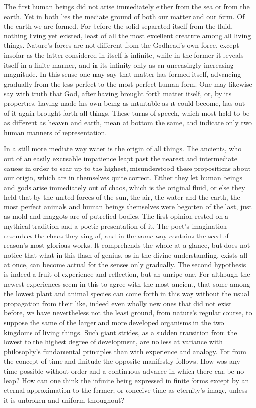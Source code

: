 \documentclass[12pt,a4paper,openany]{book}
\newcommand{\opage}[1]{\marginnote{\footnotesize\textit{[#1]}}}
\begin{document}
The first human beings did not arise immediately either from the sea or from the
earth. Yet in both lies the mediate ground of both our matter and our form. Of the
earth we are formed. For before the solid separated itself from the fluid, nothing
living yet existed, least of all the most excellent creature among all living things.
Nature's forces are not different from the Godhead's own force, except insofar as
the latter considered in itself is infinite, while in the former it reveals itself in
a finite manner, and in its infinity only as an unceasingly increasing magnitude. In
this sense one may say that matter has formed itself, advancing gradually from the
less perfect to the most perfect human form. One may likewise say with truth that
God, after having brought forth matter itself, or, by its properties, having made his
own being as intuitable as it could become, has out of it again brought forth all
things. These turns of speech, which most hold to be as different as heaven and
earth, mean at bottom the same, and indicate only two human manners of
representation.

In a still more mediate way water is the origin of all things. The ancients, who out
of an easily excusable impatience leapt past the nearest and intermediate causes in
order to
\setcounter{footnote}{0}%
\opage{111}soar up to the highest, misunderstood these propositions about our origin, which
are in themselves quite correct. Either they let human beings and gods arise
immediately out of chaos, which is the original fluid, or else they held that by the
united forces of the sun, the air, the water and the earth, the most perfect animals
and human beings themselves were begotten of the last, just as mold and maggots are
of putrefied bodies. The first opinion rested on a mythical tradition and a poetic
presentation of it. The poet's imagination resembles the chaos they sing of, and in
the same way contains the seed of reason's most glorious works. It comprehends the
whole at a glance, but does not notice that what in this flash of genius, as in the
divine understanding, exists all at once, can become actual for the senses only
gradually. The second hypothesis is indeed a fruit of experience and reflection, but
an unripe one. For although the newest experiences seem in this to agree with the
most ancient, that some among the lowest plant and animal species can come forth in
this way without the usual propagation from their like, indeed even wholly new ones
that did not exist before, we have nevertheless not the least ground, from nature's
regular course, to suppose the same of the larger and more developed organisms in
the two kingdoms of living things. Such giant strides, as a sudden transition from
the lowest to the highest degree of development, are no less at variance with
philosophy's fundamental principles than with experience and analogy. For from the
concept of time and finitude the opposite manifestly follows. How was any time
possible without order and a continuous advance in which there can be no leap? How
can one think the infinite being expressed in finite forms except by an eternal
approximation to the former; or conceive time as eternity's image, unless it is
unbroken and uniform throughout?
\end{document}
